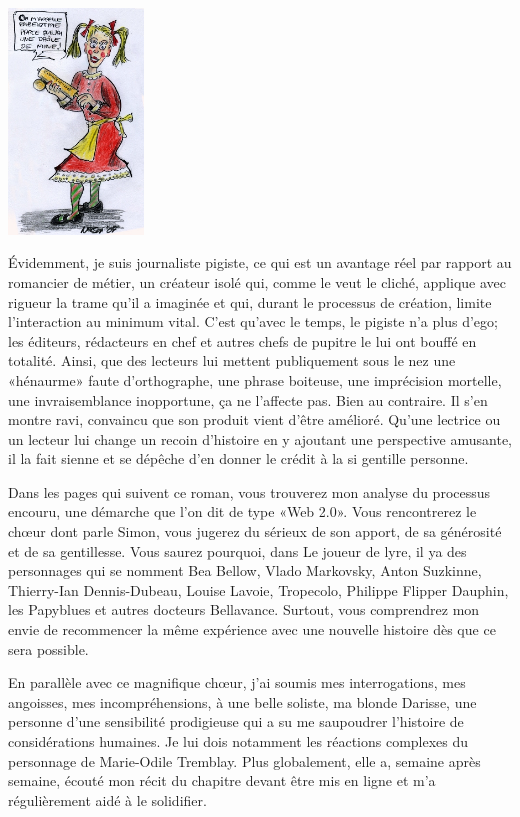 \begin{floatingfigure}[r]{30mm}
\includegraphics[height=60mm]{intro/preface/img/personnage-bibelotine.jpg}
\end{floatingfigure}

Évidemment, je suis journaliste pigiste, ce qui est un avantage réel par rapport au romancier de métier, un créateur isolé qui, comme le veut le cliché, applique avec rigueur la trame qu’il a imaginée et qui, durant le processus de création, limite l’interaction au minimum vital. C’est qu’avec le temps, le pigiste n’a plus d’ego; les éditeurs, rédacteurs en chef et autres chefs de pupitre le lui ont bouffé en totalité. Ainsi, que des lecteurs lui mettent publiquement sous le nez une «hénaurme» faute d’orthographe, une phrase boiteuse, une imprécision mortelle, une invraisemblance inopportune, ça ne l’affecte pas. Bien au contraire. Il s’en montre ravi, convaincu que son produit vient d’être amélioré. Qu’une lectrice ou un lecteur lui change un recoin d’histoire en y ajoutant une perspective amusante, il la fait sienne et se dépêche d’en donner le crédit à la si gentille personne.

Dans les pages qui suivent ce roman, vous trouverez mon analyse du processus encouru, une démarche que l’on dit de type «Web 2.0». Vous rencontrerez le chœur dont parle Simon, vous jugerez du sérieux de son apport, de sa générosité et de sa gentillesse. Vous saurez pourquoi, dans Le joueur de lyre, il ya des personnages qui se nomment Bea Bellow, Vlado Markovsky, Anton Suzkinne, Thierry-Ian Dennis-Dubeau, Louise Lavoie, Tropecolo, Philippe Flipper Dauphin, les Papyblues et autres docteurs Bellavance. Surtout, vous comprendrez mon envie de recommencer la même expérience avec une nouvelle histoire dès que ce sera possible.

En parallèle avec ce magnifique chœur, j’ai soumis mes interrogations, mes angoisses, mes incompréhensions, à une belle soliste, ma blonde Darisse, une personne d’une sensibilité prodigieuse qui a su me saupoudrer l’histoire de considérations humaines. Je lui dois notamment les réactions complexes du personnage de Marie-Odile Tremblay. Plus globalement, elle a, semaine après semaine, écouté mon récit du chapitre devant être mis en ligne et m’a régulièrement aidé à le solidifier. 

